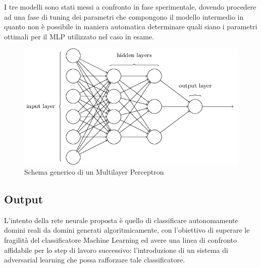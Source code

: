 I tre modelli sono stati messi a confronto in fase sperimentale, dovendo procedere ad una fase di tuning dei parametri che compongono il modello intermedio in quanto non è possibile in maniera automatica determinare quali siano i parametri ottimali per il MLP utilizzato nel caso in esame.

\begin{figure}[htbp]
	\centering
	\includegraphics[width=\columnwidth]{figures/mlp-network.png}
	\caption{Schema generico di un Multilayer Perceptron \label{mlp}}
\end{figure}

\subsection{Output}
\label{classificatorennoutput}
L'intento della rete neurale proposta è quello di classificare autonomamente domini reali da domini generati algoritmicamente, con l'obiettivo di superare le fragilità del classificatore Machine Learning ed avere una linea di confronto affidabile per lo step di lavoro successivo: l'introduzione di un sistema di adversarial learning che possa rafforzare tale classificatore. 

\newpage
